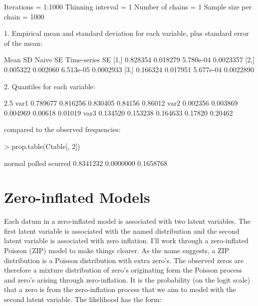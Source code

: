 \documentclass{article}
\begin{document}
\begin{Schunk}
\begin{Soutput}
Iterations = 1:1000
Thinning interval = 1 
Number of chains = 1 
Sample size per chain = 1000 

1. Empirical mean and standard deviation for each variable,
   plus standard error of the mean:

         Mean       SD  Naive SE Time-series SE
[1,] 0.828354 0.018279 5.780e-04      0.0023357
[2,] 0.005322 0.002060 6.513e-05      0.0002933
[3,] 0.166324 0.017951 5.677e-04      0.0022890

2. Quantiles for each variable:

         2.5%
var1 0.789677 0.816256 0.830405 0.84156 0.86012
var2 0.002356 0.003869 0.004969 0.00618 0.01019
var3 0.134520 0.153238 0.164633 0.17820 0.20462
\end{Soutput}
\end{Schunk}

compared to the observed frequencies:

\begin{Schunk}
\begin{Sinput}
> prop.table(Ctable[, 2])
\end{Sinput}
\begin{Soutput}
   normal    polled   scurred 
0.8341232 0.0000000 0.1658768 
\end{Soutput}
\end{Schunk}


\section{Zero-inflated Models}

Each datum in a zero-inflated model is associated with two latent variables. The first latent variable is associated with the named distribution and the second latent variable is associated with zero inflation. I'll work through a zero-inflated Poisson (ZIP) model to make things clearer. As the name suggests, a ZIP distribution is a Poisson distribution with extra zero's. The observed zeros are therefore a mixture distribution of zero's originating form the Poisson process and zero's arising through zero-inflation. It is the probability (on the logit scale) that a zero is from the zero-inflation process that we aim to model with the second latent variable. The likelihood has the form:
\end{document}
